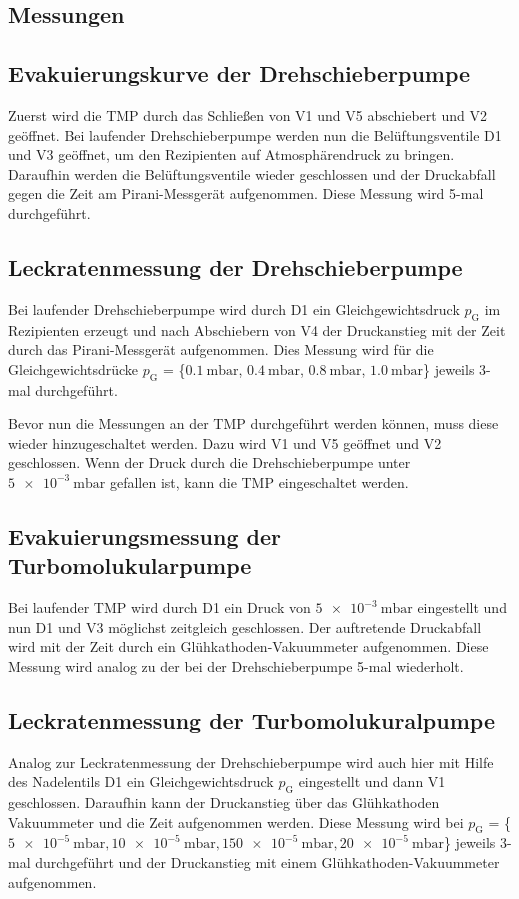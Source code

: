 \subsection{Messungen}
\subsection{Evakuierungskurve der Drehschieberpumpe}
Zuerst wird die TMP durch das Schließen von V1 und V5 abschiebert und V2 geöffnet.
Bei laufender Drehschieberpumpe werden nun die Belüftungsventile D1 und V3 geöffnet,
um den Rezipienten auf Atmosphärendruck zu bringen. Daraufhin werden die Belüftungsventile
wieder geschlossen und der Druckabfall gegen die Zeit am Pirani-Messgerät aufgenommen.
Diese Messung wird 5-mal durchgeführt.
\subsection{Leckratenmessung der Drehschieberpumpe}
Bei laufender Drehschieberpumpe wird durch D1 ein Gleichgewichtsdruck $p_\text{G}$
im Rezipienten erzeugt und nach Abschiebern von V4 der Druckanstieg mit der Zeit durch
das Pirani-Messgerät aufgenommen. Dies Messung wird für die Gleichgewichtsdrücke
$p_\text{G}$ = \{$\SI{0.1}{\milli\bar}$, $\SI{0.4}{\milli\bar}$, $\SI{0.8}{\milli\bar}$,
$\SI{1.0}{\milli\bar}$\} jeweils 3-mal durchgeführt.

Bevor nun die Messungen an der TMP durchgeführt werden können, muss diese wieder
hinzugeschaltet werden. Dazu wird V1 und V5 geöffnet und V2 geschlossen. Wenn der
Druck durch die Drehschieberpumpe unter $\SI{5e-3}{\milli\bar}$ gefallen ist, kann
die TMP eingeschaltet werden.
\subsection{Evakuierungsmessung der Turbomolukularpumpe}
Bei laufender TMP wird durch D1 ein Druck von $\SI{5e-3}{\milli\bar}$ eingestellt
und nun D1 und V3 möglichst zeitgleich geschlossen. Der auftretende Druckabfall
wird mit der Zeit durch ein Glühkathoden-Vakuummeter aufgenommen. Diese Messung
wird analog zu der bei der Drehschieberpumpe 5-mal wiederholt.
\subsection{Leckratenmessung der Turbomolukuralpumpe}
Analog zur Leckratenmessung  der Drehschieberpumpe wird auch hier mit Hilfe des Nadelentils
D1 ein Gleichgewichtsdruck $p_\text{G}$ eingestellt und dann V1 geschlossen. Daraufhin
kann der Druckanstieg über das Glühkathoden Vakuummeter und die Zeit aufgenommen werden.
Diese Messung wird bei $p_\text{G}$ = \{$\SI{5e-5}{\milli\bar}, \SI{10e-5}{\milli\bar},
\SI{150e-5}{\milli\bar}, \SI{20e-5}{\milli\bar}$\} jeweils 3-mal durchgeführt und der Druckanstieg mit einem
Glühkathoden-Vakuummeter aufgenommen.

